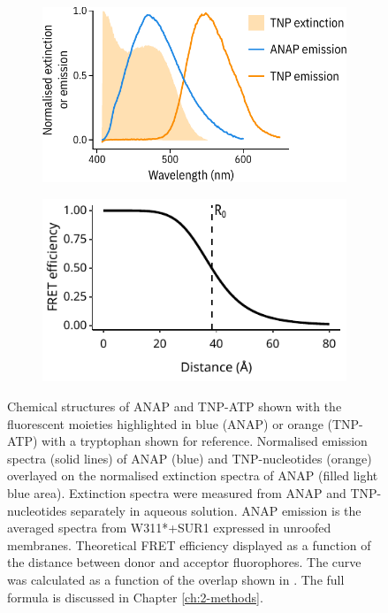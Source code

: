 \begin{figure}[hbtp]
{\begin{subfigure}[t]{0.5\textwidth}
		\includegraphics[width=\textwidth]{spectral_overlap.pdf}
	\end{subfigure}
	\hfill
	\begin{subfigure}[t]{0.5\textwidth}
		\caption{}\label{ch3fig:fret_efficiency}
		\centering
		\includegraphics[width=\textwidth]{fret_efficiency.pdf}
	\end{subfigure}
	}
	\caption[ANAP and TNP-nucleotides as FRET pairs]{
		 Chemical structures of ANAP and TNP-ATP shown with the fluorescent moieties highlighted in blue (ANAP) or orange (TNP-ATP) with a tryptophan shown for reference.
		 Normalised emission spectra (solid lines) of ANAP (blue) and TNP-nucleotides (orange) overlayed on the normalised extinction spectra of ANAP (filled light blue area).
		Extinction spectra were measured from ANAP and TNP-nucleotides separately in aqueous solution.
		ANAP emission is the averaged spectra from W311*+SUR1 expressed in unroofed membranes.
		 Theoretical FRET efficiency displayed as a function of the distance between donor and acceptor fluorophores.
		The curve was calculated as a function of the overlap shown in .
		The full formula is discussed in Chapter \ref{ch:2-methods}.
	}

\end{figure}

